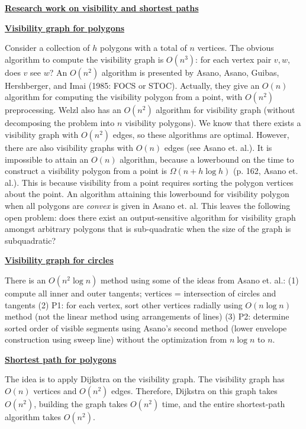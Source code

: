 

\underline{\bf Research work on visibility and shortest paths}

\underline{\bf Visibility graph for polygons}

Consider a collection of $h$ polygons with a total of $n$ vertices.
The obvious algorithm to compute the visibility graph is $O(n^{3})$:
for each vertex pair $v,w$, does $v$ see $w$?
An $O(n^{2})$ algorithm is presented by Asano, Asano, Guibas, Hershberger,
and Imai (1985: FOCS or STOC).
Actually, they give an $O(n)$ algorithm for computing the visibility polygon
from a point, with $O(n^{2})$ preprocessing.
Welzl also has an $O(n^{2})$ algorithm for visibility graph (without 
decomposing the problem into $n$ visibility polygons).
We know that there exists a visibility graph with $O(n^{2})$ edges,
so these algorithms are optimal.
However, there are also visibility graphs with $O(n)$ edges 
(see Asano et. al.).
It is impossible to attain an $O(n)$ algorithm, because a lowerbound on
the time to construct a visibility polygon from a point is 
$\Omega(n + h \log h)$ (p. 162, Asano et. al.).
This is because visibility from a point requires sorting the polygon 
vertices about the point.
An algorithm attaining this lowerbound for visibility polygon when all 
polygons are {\em convex} is given in Asano et. al.
This leaves the following open problem: does there exist an output-sensitive
algorithm for visibility graph amongst arbitrary polygons that is
sub-quadratic when the size of the graph is subquadratic?


\underline{\bf Visibility graph for circles}

There is an $O(n^{2} \log n)$ method using some of the ideas from 
Asano et. al.:
(1) compute all inner and outer tangents;  vertices = intersection of
    circles and tangents
(2) P1: for each vertex, sort other vertices radially using $O(n \log n)$ 
	method (not the linear method using arrangements of lines)
(3) P2: determine sorted order of visible segments using Asano's second 
	method (lower envelope construction using sweep line)
	without the optimization from $n \log n$ to $n$.

\underline{\bf Shortest path for polygons}

The idea is to apply Dijkstra on the visibility graph.
The visibility graph has $O(n)$ vertices and $O(n^{2})$ edges.
Therefore, Dijkstra on this graph takes $O(n^{2})$, building the graph
takes $O(n^{2})$ time, and the entire shortest-path algorithm takes 
$O(n^{2})$.

